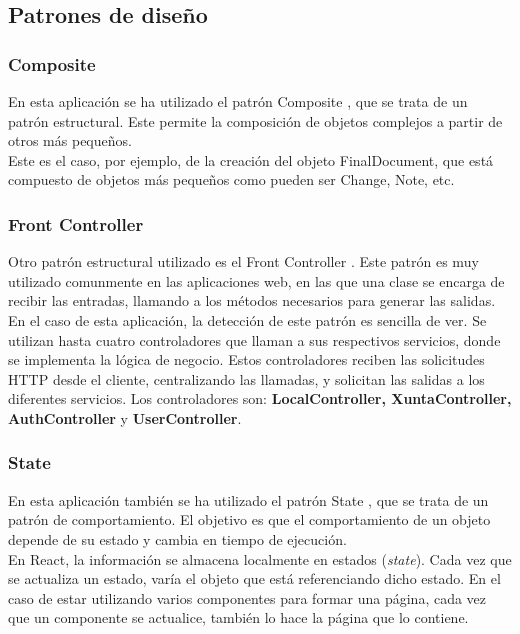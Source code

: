 \subsection{Patrones de diseño}

\subsubsection{Composite}

En esta aplicación se ha utilizado el patrón Composite \cite{composite}, que se trata de un patrón estructural. Este permite la composición de objetos complejos a partir de otros más pequeños. 
\\

Este es el caso, por ejemplo, de la creación del objeto FinalDocument, que está compuesto de objetos más pequeños como pueden ser Change, Note, etc.


\subsubsection{Front Controller}

Otro patrón estructural utilizado es el Front Controller \cite{frontcontroller}. Este patrón es muy utilizado comunmente en las aplicaciones web, en las que una clase se encarga de recibir las entradas, llamando a los métodos necesarios para generar las salidas.
\\

En el caso de esta aplicación, la detección de este patrón es sencilla de ver. Se utilizan hasta cuatro controladores que llaman a sus respectivos servicios, donde se implementa la lógica de negocio. Estos controladores reciben las solicitudes HTTP desde el cliente, centralizando las llamadas, y solicitan las salidas a los diferentes servicios. Los controladores son: {\bf LocalController, XuntaController, AuthController} y {\bf UserController}.


\subsubsection{State}

En esta aplicación también se ha utilizado el patrón State \cite{state}, que se trata de un patrón de comportamiento. El objetivo es que el comportamiento de un objeto depende de su estado y cambia en tiempo de ejecución. 
\\

En React, la información se almacena localmente en estados ({\it state}). Cada vez que se actualiza un estado, varía el objeto que está referenciando dicho estado. En el caso de estar utilizando varios componentes para formar una página, cada vez que un componente se actualice, también lo hace la página que lo contiene.


